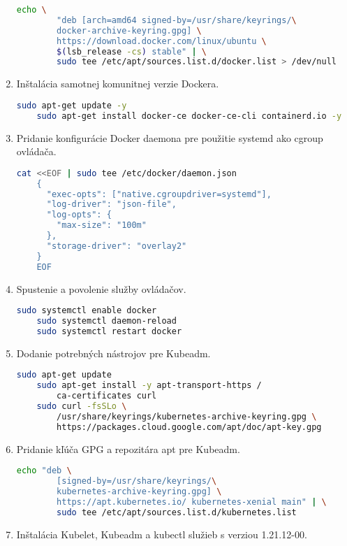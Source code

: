 \begin{enumerate}
{\begin{lstlisting}[language=Bash,basicstyle=\footnotesize]
    echo \
        "deb [arch=amd64 signed-by=/usr/share/keyrings/\
        docker-archive-keyring.gpg] \
        https://download.docker.com/linux/ubuntu \
        $(lsb_release -cs) stable" | \
        sudo tee /etc/apt/sources.list.d/docker.list > /dev/null
\end{lstlisting}}
\item{\noindent Inštalácia samotnej komunitnej verzie Dockera.
\begin{lstlisting}[language=Bash,basicstyle=\footnotesize]
    sudo apt-get update -y
    sudo apt-get install docker-ce docker-ce-cli containerd.io -y
\end{lstlisting}}
\item{\noindent Pridanie konfigurácie Docker daemona pre použitie systemd ako cgroup ovládača.
\begin{lstlisting}[language=Bash,basicstyle=\footnotesize]
    cat <<EOF | sudo tee /etc/docker/daemon.json
    {
      "exec-opts": ["native.cgroupdriver=systemd"],
      "log-driver": "json-file",
      "log-opts": {
        "max-size": "100m"
      },
      "storage-driver": "overlay2"
    }
    EOF
\end{lstlisting}}
\item{\noindent Spustenie a povolenie služby ovládačov.
\begin{lstlisting}[language=Bash,basicstyle=\footnotesize]
    sudo systemctl enable docker
    sudo systemctl daemon-reload
    sudo systemctl restart docker
\end{lstlisting}}
\item{\noindent Dodanie potrebných nástrojov pre Kubeadm.
\begin{lstlisting}[language=Bash,basicstyle=\footnotesize]
    sudo apt-get update
    sudo apt-get install -y apt-transport-https /
        ca-certificates curl
    sudo curl -fsSLo \
        /usr/share/keyrings/kubernetes-archive-keyring.gpg \
        https://packages.cloud.google.com/apt/doc/apt-key.gpg
\end{lstlisting}}
\item{\noindent Pridanie kľúča GPG a repozitára apt pre Kubeadm.
\begin{lstlisting}[language=Bash,basicstyle=\footnotesize]
    echo "deb \
        [signed-by=/usr/share/keyrings/\
        kubernetes-archive-keyring.gpg] \
        https://apt.kubernetes.io/ kubernetes-xenial main" | \
        sudo tee /etc/apt/sources.list.d/kubernetes.list
\end{lstlisting}}
\item{\noindent Inštalácia Kubelet, Kubeadm a kubectl služieb s verziou 1.21.12-00.
}
\end{enumerate}
